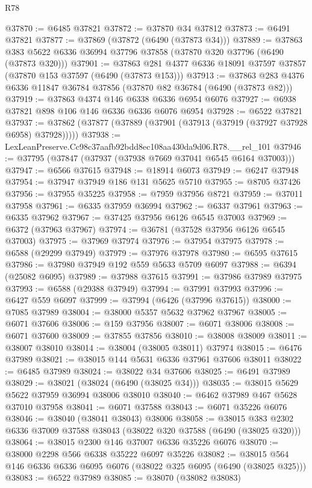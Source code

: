 \begin{lexlean}{R78}
\begin{coremodule}
@37870 := @6485 @37821
@37872 := @37870 @34 @37812
@37873 := @6491 @37821
@37877 := @37869 (@37872 (@6490 (@37873 @34)))
@37889 := @37863 @383 @5622 @6336 @36994 @37796 @37858 (@37870 @320 @37796 (@6490 (@37873 @320)))
@37901 := @37863 @281 @4377 @6336 @18091 @37597 @37857 (@37870 @153 @37597 (@6490 (@37873 @153)))
@37913 := @37863 @283 @4376 @6336 @11847 @36784 @37856 (@37870 @82 @36784 (@6490 (@37873 @82)))
@37919 := @37863 @4374 @146 @6338 @6336 @6954 @6076
@37927 := @6938 @37821 @898 @106 @146 @6336 @6336 @6076 @6954
@37928 := @6522 @37821
@37937 := @37862 (@37877 (@37889 (@37901 (@37913 (@37919 (@37927 @37928 @6958) @37928)))))
@37938 := LexLeanPreserve.Cc98c37aafb92bdd8ec108aa430da9d06.R78.__rel_101
@37946 := @37795 (@37847 (@37937 (@37938 @7669 @37041 @6545 @6164 @37003)))
@37947 := @6566 @37615
@37948 := @18914 @6073
@37949 := @6247 @37948
@37954 := @37947 @37949 @186 @131 @5625 @5710
@37955 := @8705 @37426
@37956 := @37955 @35225
@37958 := @7959 @37956 @8721
@37959 := @37011 @37958
@37961 := @6335 @37959 @36994
@37962 := @6337 @37961
@37963 := @6335 @37962
@37967 := @37425 @37956 @6126 @6545 @37003
@37969 := @6372 (@37963 @37967)
@37974 := @36781 (@37528 @37956 @6126 @6545 @37003)
@37975 := @37969 @37974
@37976 := @37954 @37975
@37978 := @6588 (@29299 @37949)
@37979 := @37976 @37978
@37980 := @6595 @37615
@37986 := @37980 @37949 @192 @559 @5633 @5709 @6097
@37988 := @6394 (@25082 @6095)
@37989 := @37988 @37615
@37991 := @37986 @37989 @37975
@37993 := @6588 (@29388 @37949)
@37994 := @37991 @37993
@37996 := @6427 @559 @6097
@37999 := @37994 (@6426 (@37996 @37615))
@38000 := @7085 @37989
@38004 := @38000 @5357 @5632 @37962 @37967
@38005 := @6071 @37606
@38006 := @159 @37956
@38007 := @6071 @38006
@38008 := @6071 @37600
@38009 := @37855 @37856
@38010 := @38008 @38009
@38011 := @38007 @38010
@38014 := @38004 (@38005 @38011) @37974
@38015 := @6476 @37989
@38021 := @38015 @144 @5631 @6336 @37961 @37606 @38011
@38022 := @6485 @37989
@38024 := @38022 @34 @37606
@38025 := @6491 @37989
@38029 := @38021 (@38024 (@6490 (@38025 @34)))
@38035 := @38015 @5629 @5622 @37959 @36994 @38006 @38010
@38040 := @6462 @37989 @467 @5628 @37010 @37958
@38041 := @6071 @37588
@38043 := @6071 @35226 @6076
@38046 := @38040 (@38041 @38043) @38006
@38058 := @38015 @383 @2302 @6336 @37009 @37588 @38043 (@38022 @320 @37588 (@6490 (@38025 @320)))
@38064 := @38015 @2300 @146 @37007 @6336 @35226 @6076
@38070 := @38000 @2298 @566 @6338 @35222 @6097 @35226
@38082 := @38015 @564 @146 @6336 @6336 @6095 @6076 (@38022 @325 @6095 (@6490 (@38025 @325)))
@38083 := @6522 @37989
@38085 := @38070 (@38082 @38083)

\end{coremodule}
\end{lexlean}
